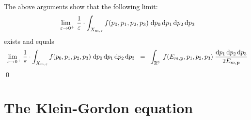 The above arguments show that the following limit:
\begin{equation*}
\underset{{\color{white}..}\varepsilon\rightarrow 0^{+}}{\lim}\;
\dfrac{1}{\varepsilon}
\cdot
\int_{X_{m,\varepsilon}} f(p_{0},p_{1},p_{2},p_{3}) \;\d p_{0}\,\d p_{1}\,\d p_{2}\,\d p_{3} 
\end{equation*}
exists and equals
\begin{equation*}
\underset{{\color{white}..}\varepsilon\rightarrow 0^{+}}{\lim}\;
\dfrac{1}{\varepsilon}
\cdot
\int_{X_{m,\varepsilon}} f(p_{0},p_{1},p_{2},p_{3}) \;\d p_{0}\,\d p_{1}\,\d p_{2}\,\d p_{3}
\;\; = \;\;
	\int_{\Re^{3}}\;
		f(E_{m,\mathbf{p}},p_{1},p_{2},p_{3})
	\;\dfrac{
		\d p_{1}\,\d p_{2}\,\d p_{3} 
		}{
		2 E_{m,\mathbf{p}}
		}
\end{equation*}
\qed


\vskip 1.0cm
\section{The Klein-Gordon equation}


